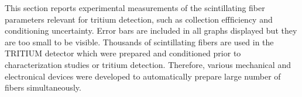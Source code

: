 This section reports experimental measurements of the scintillating fiber parameters relevant for tritium detection, such as collection effficiency and conditioning uncertainty. Error bars are included in all graphs displayed but they are too small to be visible. Thousands of scintillating fibers are used in the TRITIUM detector which were prepared and conditioned prior to characterization studies or tritium detection. Therefore, various mechanical and electronical devices were developed to automatically prepare large number of fibers simultaneously.